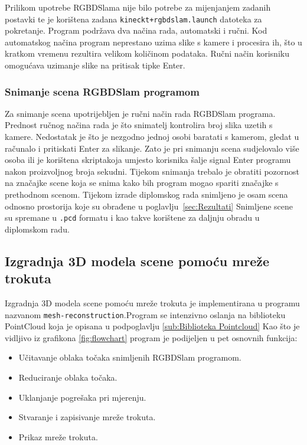 Prilikom upotrebe RGBDSlama nije bilo potrebe za mijenjanjem zadanih
postavki te je korištena zadana \texttt{kineckt+rgbdslam.launch}
datoteka za pokretanje. Program podržava dva načina rada, automatski i
ručni. Kod automatskog načina program neprestano uzima slike s kamere i
procesira ih, što u kratkom vremenu rezultira velikom količinom
podataka. Ručni način korisniku omogućava uzimanje slike na pritisak
tipke Enter.


\newpage
\subsubsection{Snimanje scena RGBDSlam programom} %
\label{ssub:Snimanje scena RGBDSlam programom}

Za snimanje scena upotrijebljen je ručni način rada RGBDSlam programa.
Prednost ručnog načina rada je što snimatelj kontrolira broj slika
uzetih s kamere. Nedostatak je što je nezgodno jednoj osobi baratati s
kamerom, gledat u računalo i pritiskati Enter za slikanje. Zato je pri
snimanju scena sudjelovalo više osoba ili je korištena
skripta\footnotemark[1] koja umjesto korisnika šalje signal Enter
programu nakon proizvoljnog broja sekudni. Tijekom snimanja trebalo je
obratiti pozornost na značajke scene koja se snima kako bih program
mogao spariti značajke s prethodnom scenom. Tijekom izrade diplomskog
rada snimljeno je osam scena odnosno prostorija koje su obrađene u
poglavlju~\ref{sec:Rezultati} Snimljene scene su spremane u
\texttt{.pcd} formatu i kao takve korištene za daljnju obradu u
diplomskom radu.




\newpage
\subsection{Izgradnja 3D modela scene pomoću mreže trokuta} %
\label{sub:Izgradnja 3D modela scene pomoću mreže trokuta}

Izgradnja 3D modela scene pomoću mreže trokuta je implementirana u
programu nazvanom \texttt{mesh-reconstruction}.\footnotemark[1]
Program se intenzivno oslanja na biblioteku PointCloud koja je opisana u
podpoglavlju \ref{sub:Biblioteka Pointcloud} Kao što je vidljivo iz
grafikona \ref{fig:flowchart} program je podijeljen u pet osnovnih
funkcija:
\begin{itemize}
    \item Učitavanje oblaka točaka snimljenih RGBDSlam programom.
    \item Reduciranje oblaka točaka.
    \item Uklanjanje pogrešaka pri mjerenju.
    \item Stvaranje i zapisivanje mreže trokuta.
    \item Prikaz mreže trokuta.
\end{itemize}

